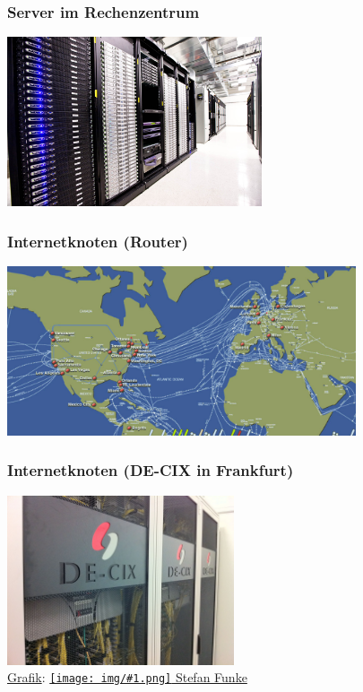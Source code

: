 \documentclass[12pt]{beamer}
\newcommand{\cc}[1]{\texttt{[image: img/\#1.png]}\hspace{1mm}}
\begin{document}
\begin{frame}
    \frametitle{Server im Rechenzentrum}
    \begin{center}
      \includegraphics[height=5cm]{img/data_center.jpg}
    \end{center}
\end{frame}

\begin{frame}
    \frametitle{Internetknoten (Router)}
    \begin{center}
      \includegraphics[height=5cm]{img/internet_cable_map.png}
    \end{center}
\end{frame}

\begin{frame}
    \frametitle{Internetknoten (DE-CIX in Frankfurt)}
    \begin{center}
      \includegraphics[height=5cm]{img/de_cix.jpg}
      \\{\small \href{https://de.wikipedia.org/wiki/DE-CIX\#/media/File:DE-CIX\_GERMANY\_-\_Switch\_Rack\_\%286218137120\%29.jpg}{Grafik}: \href{https://creativecommons.org/licenses/by-sa/2.0/}{\cc{by-sa} Stefan Funke}}
    \end{center}
\end{frame}
\end{document}
